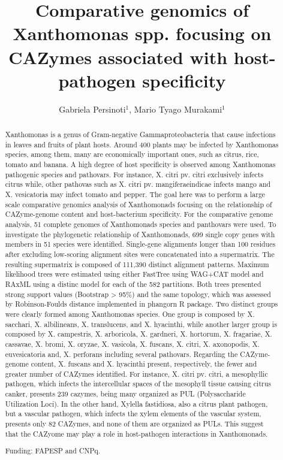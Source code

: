 \documentclass[twoside]{article}
\title{\vspace{-15mm}\fontsize{24pt}{10pt}\selectfont\textbf{Comparative genomics of Xanthomonas spp. focusing on CAZymes associated with host-pathogen specificity}} %
\author{Gabriela Persinoti$^1$, Mario Tyago Murakami$^1$}
\affil{1 CTBE/CNPEM\\ }
\date{}
\begin{document}
\maketitle %

\thispagestyle{fancy} %


\begin{abstract}
Xanthomonas is a genus of Gram-negative Gammaproteobacteria that cause infections in leaves and fruits of plant hosts. Around 400 plants may be infected by Xanthomonas species, among them, many are economically important ones, such as citrus, rice, tomato and banana. A high degree of host specificity is observed among Xanthomonas pathogenic species and pathovars. For instance, X. citri pv. citri exclusively infects citrus while, other pathovas such as X. citri pv. mangiferaeindicae infects mango and X. vesicatoria may infect tomato and pepper. The goal here was to perform a large scale comparative genomics analysis of Xanthomonads focusing on the relationship of CAZyme-genome content and host-bacterium specificity. For the comparative genome analysis, 51 complete genomes of Xanthomonads species and panthovars were used. To investigate the phylogenetic relationship of Xanthomonads, 699 single copy genes with members in 51 species were identified. Single-gene alignments longer than 100 residues after excluding low-scoring alignment sites were concatenated into a supermatrix. The resulting supermatrix is composed of 111,390 distinct alignment patterns. Maximum likelihood trees were estimated using either FastTree using WAG+CAT model and RAxML using a distinc model for each of the 582 partitions. Both trees presented strong support values (Bootstrap > 95\%) and the same topology, which was assessed by Robinson-Foulds distance implemented in phangorn R package. Two distinct groups were clearly formed among Xanthomonas species. One group is composed by X. sacchari, X. albilineans, X. translucens, and X. hyacinthi, while another larger group is composed by X.  campestris, X.  arboricola, X.  gardneri, X.  hortorum, X.  fragariae, X.  cassavae, X. bromi, X.  oryzae, X.  vasicola, X.  fuscans, X.  citri, X.  axonopodis, X.  euvesicatoria and, X.  perforans including several pathovars. Regarding the CAZyme-genome content, X. fuscans and X. hyacinthi present, respectively, the fewer and greater number of CAZymes identified. For instance, X. citri pv. citri, a mesophyllic pathogen, which infects the intercellular spaces of the mesophyll tissue causing citrus canker, presents 239 cazymes, being many organized as PUL (Polysaccharide Utilization Loci). In the other hand, Xylella fastidiosa, also a citrus plant pathogen, but a vascular pathogen, which infects the xylem elements of the vascular system, presents only 82 CAZymes, and none of them are organized as PULs. This suggest that the CAZyome may play a role in host-pathogen interactions in Xanthomonads.

Funding: FAPESP and CNPq.
\end{abstract}
\end{document}
